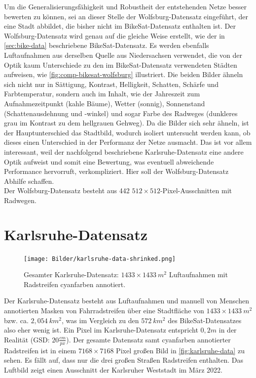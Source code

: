 Um die Generalisierungsfähigkeit und Robustheit der entstehenden Netze besser bewerten zu können, sei an dieser Stelle 
der Wolfsburg-Datensatz eingeführt, der eine Stadt abbildet, die bisher nicht im BikeSat-Datensatz enthalten ist. 
Der Wolfsburg-Datensatz wird genau auf die gleiche Weise erstellt, wie 
der in \autoref{sec:bike-data} beschriebene BikeSat-Datensatz. Es werden ebenfalls Luftaufnahmen aus derselben Quelle
aus Niedersachsen verwendet, 
die von der Optik kaum Unterschiede zu den im BikeSat-Datensatz verwendeten Städten aufweisen, wie 
\autoref{fig:comp-bikesat-wolfsburg} illustriert. Die beiden Bilder ähneln sich nicht nur in Sättigung, Kontrast,
Helligkeit, Schatten, Schärfe und Farbtemperatur, sondern auch im Inhalt, wie der Jahreszeit zum Aufnahmezeitpunkt 
(kahle Bäume), Wetter (sonnig), Sonnenstand (Schattenausdehnung und -winkel) und sogar Farbe des Radweges 
(dunkleres grau im Kontrast zu dem hellgrauen Gehweg). Da die Bilder sich sehr ähneln, ist der Hauptunterschied 
das Stadtbild, wodurch isoliert untersucht werden kann, ob dieses einen Unterschied in der Performanz der Netze ausmacht. 
Das ist vor allem interessant, weil der nachfolgend beschriebene Karlsruhe-Datensatz eine andere Optik 
aufweist und somit eine Bewertung, was eventuell abweichende Performance hervorruft, verkompliziert.
Hier soll der Wolfsburg-Datensatz Abhilfe schaffen. \\ 
Der Wolfsburg-Datensatz besteht aus 442 $512{\times}512$-Pixel-Ausschnitten mit Radwegen. 

\section{Karlsruhe-Datensatz} \label{sec:karlsruhe}


\begin{figure}[h]
	\centering
	\texttt{[image: Bilder/karlsruhe-data-shrinked.png]} 
	\caption{Gesamter Karlsruhe-Datensatz: $1433{\times}1433~ m^2$ Luftaufnahmen mit Radstreifen cyanfarben annotiert.}
	\label{fig:karlsruhe-data}
\end{figure} 

Der Karlsruhe-Datensatz besteht aus Luftaufnahmen und manuell von Menschen annotierten Masken von Fahrradstreifen 
über eine Stadtfläche von $1433{\times}1433~ m^2$ bzw. ca. $2,054~ km^2$, was im Vergleich zu den 
$572~ km^2$ des BikeSat-Datensatzes also eher wenig ist. 
Ein Pixel im Karlsruhe-Datensatz entspricht $0,2m$ in der Realität (GSD: $20 \frac{cm}{px}$).
Der gesamte Datensatz samt cyanfarben annotierter Radstreifen ist in einem 
$7168{\times}7168$ Pixel großen Bild in \autoref{fig:karlsruhe-data} zu sehen. Es fällt auf, 
dass nur die drei großen Straßen Radstreifen enthalten. Das Luftbild zeigt einen Ausschnitt der Karlsruher Weststadt im März 2022. 



